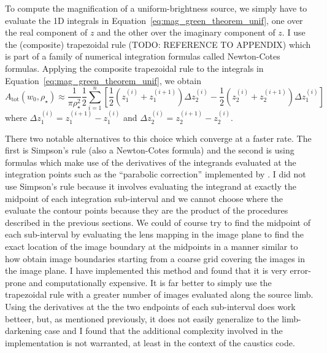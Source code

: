 \documentclass[12pt,dvipsnames]{report}
\newcommand{\ssf}[1]{\textsf{#1}}
\begin{document}
To compute the magnification of a uniform-brightness source, we simply have to evaluate the 1D 
integrals in Equation~\ref{eq:mag_green_theorem_unif}, one over the real component of $z$
and the other over the imaginary component of $z$. 
I use the (composite) \ssf{trapezoidal rule} (TODO: REFERENCE TO APPENDIX) which is part of 
a family of numerical integration formulas called \ssf{Newton-Cotes formulas}. 
Applying the composite trapezoidal rule to the integrals in Equation~\ref{eq:mag_green_theorem_unif},
we obtain
\begin{equation}
    A_\mathrm{tot}\left(w_0, \rho_{\star}\right)\approx  \frac{1}{ \pi \rho_{\star}^{2}}
    \frac{1}{2}\sum_{i=1}^{n}\left[\frac{1}{2}\left(z_1^{(i)}+z_1^{(i+1)}\right)\Delta z_2^{(i)}
    -\frac{1}{2}\left(z_2^{(i)}+z_2^{(i+1)}\right)\Delta z_1^{(i)}\right]
\end{equation}
where $\Delta z_1^{(i)}= z_1^{(i+1)}-z_1^{(i)}$ and $\Delta z_2^{(i)}= z_2^{(i+1)}-z_2^{(i)}$.


There two notable alternatives to this choice which converge at a faster rate. The first 
is \ssf{Simpson's rule}
(also a Newton-Cotes formula) and the second is using formulas which make use of the derivatives 
of the integrands evaluated at the integration points such as the ``parabolic correction''
implemented by \citet{2010MNRAS.408.2188B}. I did not use Simpson's rule because it involves 
evaluating the integrand at exactly the midpoint of each integration sub-interval and we cannot 
choose where the evaluate the contour points because they are the product of the procedures 
described in the previous sections. We could of course try to find the midpoint of each 
sub-interval by evaluating the lens mapping in the image plane to find the exact location of the 
image boundary at the midpoints in a manner similar to how \citet{2010ApJ...716.1408B} obtain 
image boundaries starting from a coarse grid covering the images in the image plane. I have 
implemented this method and found that it is very error-prone and computationally expensive. It 
is far better to simply use the trapezoidal rule with a greater number of images evaluated 
along the source limb.  Using the derivatives at the the two endpoints of each sub-interval 
does work betteer, but, as mentioned previously, it does not easily generalize to the 
limb-darkening case and I found that the additional complexity involved in the implementation 
is not warranted, at least in the context of the \ssf{caustics} code.
\end{document}
